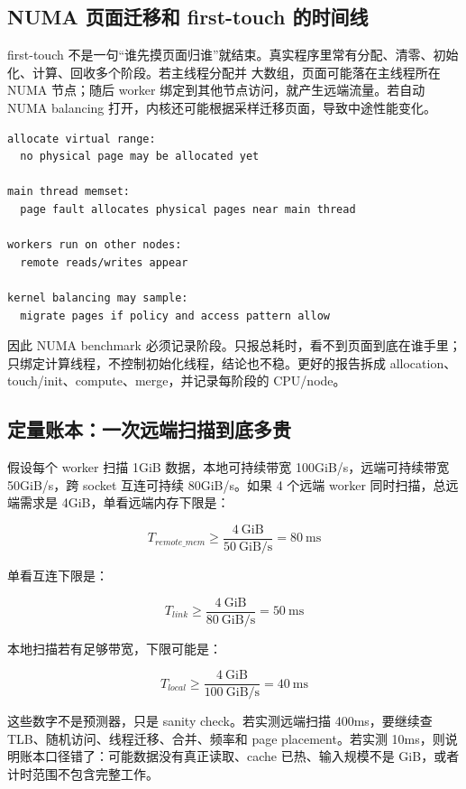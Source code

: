 \subsection{NUMA 页面迁移和 first-touch 的时间线}

first-touch 不是一句“谁先摸页面归谁”就结束。真实程序里常有分配、清零、初始化、计算、回收多个阶段。若主线程分配并  大数组，页面可能落在主线程所在 NUMA 节点；随后 worker 绑定到其他节点访问，就产生远端流量。若自动 NUMA balancing 打开，内核还可能根据采样迁移页面，导致中途性能变化。

\begin{lstlisting}[numbers=none,caption={页面放置时间线}]
allocate virtual range:
  no physical page may be allocated yet

main thread memset:
  page fault allocates physical pages near main thread

workers run on other nodes:
  remote reads/writes appear

kernel balancing may sample:
  migrate pages if policy and access pattern allow
\end{lstlisting}

因此 NUMA benchmark 必须记录阶段。只报总耗时，看不到页面到底在谁手里；只绑定计算线程，不控制初始化线程，结论也不稳。更好的报告拆成 allocation、touch/init、compute、merge，并记录每阶段的 CPU/node。

\subsection{定量账本：一次远端扫描到底多贵}

假设每个 worker 扫描 1GiB 数据，本地可持续带宽 100GiB/s，远端可持续带宽 50GiB/s，跨 socket 互连可持续 80GiB/s。如果 4 个远端 worker 同时扫描，总远端需求是 4GiB，单看远端内存下限是：

\[
T_{remote\_mem} \ge \frac{4\ \mathrm{GiB}}{50\ \mathrm{GiB/s}} = 80\ \mathrm{ms}
\]

单看互连下限是：

\[
T_{link} \ge \frac{4\ \mathrm{GiB}}{80\ \mathrm{GiB/s}} = 50\ \mathrm{ms}
\]

本地扫描若有足够带宽，下限可能是：

\[
T_{local} \ge \frac{4\ \mathrm{GiB}}{100\ \mathrm{GiB/s}} = 40\ \mathrm{ms}
\]

这些数字不是预测器，只是 sanity check。若实测远端扫描 400ms，要继续查 TLB、随机访问、线程迁移、合并、频率和 page placement。若实测 10ms，则说明账本口径错了：可能数据没有真正读取、cache 已热、输入规模不是 GiB，或者计时范围不包含完整工作。

